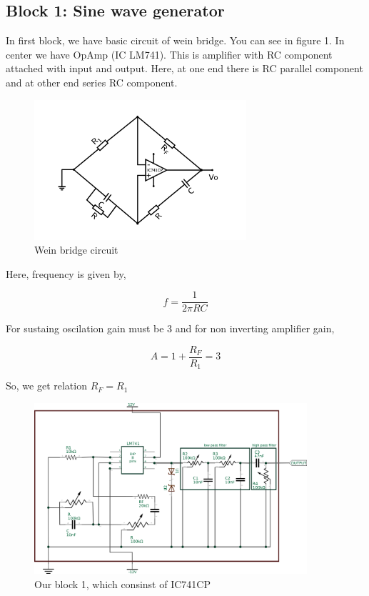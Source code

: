 \documentclass[14pt,a4paper]{extarticle}
\begin{document}
\subsection{Block 1: Sine wave generator}
\label{sec:org6e13760}


In first block, we have basic circuit of wein bridge. You can see in figure 1. In center we have OpAmp (IC LM741). This is amplifier with RC component attached with input and output. Here, at one end there is RC parallel component and at other end series RC component. 


\begin{figure}[ht]
    \centering
    \label{sine}
    \includegraphics[width=0.7\textwidth]{imgs/sine.png}
    \caption{Wein bridge circuit}
\end{figure}

Here, frequency is given by, 

\begin{equation}
\label{eq:org513cb7c}
  f =\frac{1}{2 \pi RC}
\end{equation}

For sustaing oscilation gain must be 3 and for non inverting amplifier gain, 

\begin{equation}
\label{eq:orgad3dd9a}
  A = 1+\frac{R_{F}}{R_{1}} = 3
\end{equation}

So, we get relation \(R_{F}=R_{1}\)

\begin{figure}[ht]
    \centering
    \includegraphics[width=0.9\textwidth]{imgs/sinereal.png}
    \caption{Our block 1, which consinst of IC741CP}
    \label{fig:realsine}
\end{figure}
\end{document}
